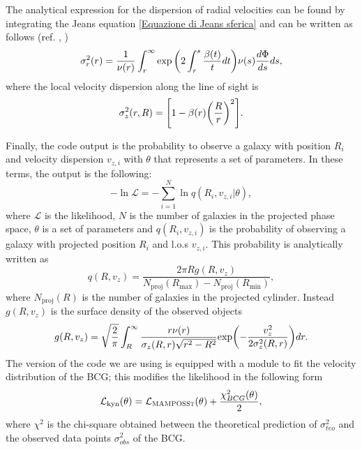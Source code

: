 The analytical expression for the dispersion of radial velocities can be found by integrating the Jeans equation \eqref{Equazione di Jeans sferica} and can be written as follows (ref. \cite{MG-MAMPOSST:a-code-to-test-modifications-of-gravity-with-internal-kinematics-and-lensing-analyses-of-galaxy-clusters}, \cite{Biviano_MAMPOSSt})
\begin{equation}
    \sigma^2 _r (r) = \frac{1}{\nu(r)} \int_r ^\infty \exp \qty(2\int_r ^s \frac{\beta(t)}{t} dt) \nu (s) \frac{d\Phi}{ds} ds,
\end{equation}
where the local velocity dispersion along the line of sight is 
\begin{equation}
    \sigma_z^2 (r, R) = \qty[1-\beta(r)\qty(\frac{R}{r})^2].
\end{equation}

Finally, the code output is the probability to observe a galaxy with position $R_i$ and velocity dispersion $v_{z,i}$ with $\theta$ that represents a set of parameters. In these terms, the output is the following:
\begin{equation}
    - \ln \mathcal{L} = -\sum_{i=1} ^N \ln q(R_i, v_{z,i} | \theta) ,
\end{equation}
where $\mathcal{L}$ is the likelihood, $N$ is the number of galaxies in the projected phase space, $\theta$ is a set of parameters and $q(R_i, v_{z,i})$ is the probability of observing a galaxy with projected position $R_i$ and l.o.s $v_{z,i}$. This probability is analytically written as
\begin{equation}
    q(R, v_z) = \frac{2 \pi R g(R, v_z)}{N_{\text{proj}} (R_{\text{max}}) - N_{\text{proj}} (R_{\text{min}})},
\end{equation}
where $N_{\text{proj}} (R)$ is the number of galaxies in the projected cylinder. Instead $g(R, v_z)$ is the surface density of the observed objects
\begin{equation}
    g(R, v_z) = \sqrt{\frac{2}{\pi}} \int_R ^\infty \frac{r\nu(r)}{\sigma_z (R, r) \sqrt{r^2 - R^2}} \text{exp}\qty(-\frac{v_z^2}{2\sigma_z^2(R, r)})dr.
\end{equation}
The version of the code we are using is equipped with a module to fit the velocity distribution of the BCG; this modifies the likelihood in the following form
\begin{equation}
    \mathcal{L}_{\text{kyn}} (\theta) = \mathcal{L}_{\textsc{MAMPOSSt}} (\theta) + \frac{\chi^2_{BCG} (\theta)}{2},
\end{equation}
where $\chi^2$ is the chi-square obtained between the theoretical prediction of $\sigma^2_{teo}$ and the observed data points $\sigma^2_{obs}$ of the BCG.

